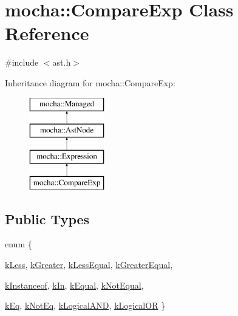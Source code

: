 \hypertarget{classmocha_1_1_compare_exp}{
\section{mocha::CompareExp Class Reference}
\label{classmocha_1_1_compare_exp}
}


{\ttfamily \#include $<$ast.h$>$}

Inheritance diagram for mocha::CompareExp:\begin{figure}[H]
\begin{center}
\leavevmode
\includegraphics[height=4.000000cm]{classmocha_1_1_compare_exp}
\end{center}
\end{figure}
\subsection*{Public Types}
\begin{DoxyCompactItemize}
\item 
enum \{ \par
\hyperlink{classmocha_1_1_compare_exp_aa5ba2ba7107f66e1ffc940a3d09b12b3ad1e491ea0ed9a3a75cd6df6b7964fb24}{kLess}, 
\hyperlink{classmocha_1_1_compare_exp_aa5ba2ba7107f66e1ffc940a3d09b12b3a84acae9e2959eaf621dd2c9007394b53}{kGreater}, 
\hyperlink{classmocha_1_1_compare_exp_aa5ba2ba7107f66e1ffc940a3d09b12b3abf14e7794f87bcd14e2984beaaa44d6a}{kLessEqual}, 
\hyperlink{classmocha_1_1_compare_exp_aa5ba2ba7107f66e1ffc940a3d09b12b3a919b2deb962643cad716dd3dadb9322a}{kGreaterEqual}, 
\par
\hyperlink{classmocha_1_1_compare_exp_aa5ba2ba7107f66e1ffc940a3d09b12b3a0af853b4a91a6ab164b7a2cb71a96e7b}{kInstanceof}, 
\hyperlink{classmocha_1_1_compare_exp_aa5ba2ba7107f66e1ffc940a3d09b12b3afb1b9d3fc6d7fb194007adfeda3cf623}{kIn}, 
\hyperlink{classmocha_1_1_compare_exp_aa5ba2ba7107f66e1ffc940a3d09b12b3a71b370ae38daa71371b7c372b1c28883}{kEqual}, 
\hyperlink{classmocha_1_1_compare_exp_aa5ba2ba7107f66e1ffc940a3d09b12b3a1df6ff896a14072a02aeb0f70291acb4}{kNotEqual}, 
\par
\hyperlink{classmocha_1_1_compare_exp_aa5ba2ba7107f66e1ffc940a3d09b12b3af83ad9b9e18e5353d951c80b8d3d5853}{kEq}, 
\hyperlink{classmocha_1_1_compare_exp_aa5ba2ba7107f66e1ffc940a3d09b12b3ad8c0fc6a2937e66f4fc233249182723a}{kNotEq}, 
\hyperlink{classmocha_1_1_compare_exp_aa5ba2ba7107f66e1ffc940a3d09b12b3a2797128d472ed86d91dc020994858ab0}{kLogicalAND}, 
\hyperlink{classmocha_1_1_compare_exp_aa5ba2ba7107f66e1ffc940a3d09b12b3a82a42371f7907ffdffed444474127430}{kLogicalOR}
 \}
\end{DoxyCompactItemize}
